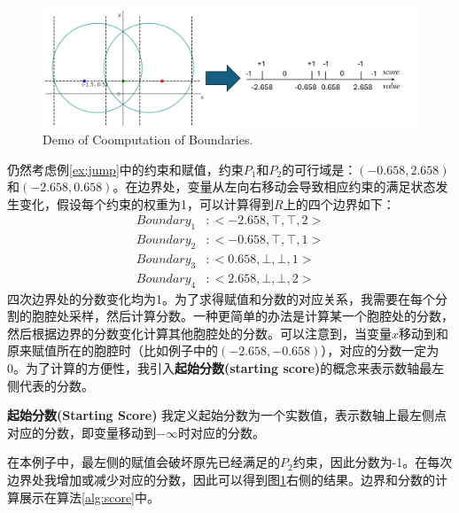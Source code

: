 \begin{example}
\label{ex:jump2}
\begin{figure}[t]
    \centering
    \includegraphics[width=\columnwidth]{Img/boundary.png}
     {Demo of Coomputation of Boundaries.}
\label{fig:boundary}
\end{figure}

仍然考虑例\ref{ex:jump}中的约束和赋值，约束$P_1$和$P_2$的可行域是：$(-0.658, 2.658)$和$(-2.658, 0.658)$。在边界处，变量从左向右移动会导致相应约束的满足状态发生变化，假设每个约束的权重为1，可以计算得到$R$上的四个边界如下：
\begin{align}
Boundary_1 &: <-2.658, \top, \top, 2> \nonumber \\
Boundary_2 &: <-0.658, \top, \top, 1> \nonumber \\
Boundary_3 &: <0.658, \bot, \bot, 1> \nonumber \\
Boundary_4 &: <2.658, \bot, \bot, 2> \nonumber
\end{align}
四次边界处的分数变化均为1。为了求得赋值和分数的对应关系，我需要在每个分割的胞腔处采样，然后计算分数。一种更简单的办法是计算某一个胞腔处的分数，然后根据边界的分数变化计算其他胞腔处的分数。可以注意到，当变量$x$移动到和原来赋值所在的胞腔时（比如例子中的$(-2.658, -0.658)$），对应的分数一定为0。为了计算的方便性，我引入\textbf{起始分数(starting score)}的概念来表示数轴最左侧代表的分数。

\begin{definition}{\textbf{起始分数(Starting Score)}}
我定义起始分数为一个实数值，表示数轴上最左侧点对应的分数，即变量移动到$-\infty$时对应的分数。
\end{definition}
在本例子中，最左侧的赋值会破坏原先已经满足的$P_2$约束，因此分数为-1。在每次边界处我增加或减少对应的分数，因此可以得到图\ref{fig:boundary}右侧的结果。边界和分数的计算展示在算法\ref{alg:score}中。
\end{example}

